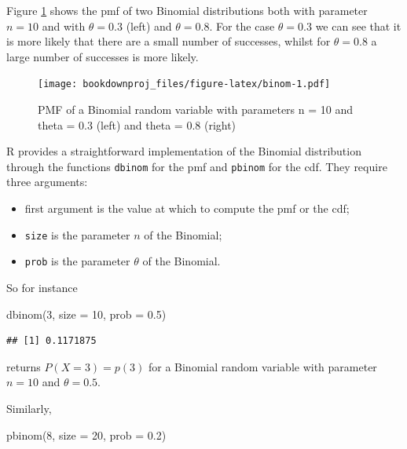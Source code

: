 \documentclass[
]{book}
\newenvironment{Shaded}{\begin{snugshade}}{\end{snugshade}}
\newcommand{\AttributeTok}[1]{\textcolor[rgb]{0.77,0.63,0.00}{#1}}
\newcommand{\DecValTok}[1]{\textcolor[rgb]{0.00,0.00,0.81}{#1}}
\newcommand{\FloatTok}[1]{\textcolor[rgb]{0.00,0.00,0.81}{#1}}
\newcommand{\FunctionTok}[1]{\textcolor[rgb]{0.00,0.00,0.00}{#1}}
\newcommand{\NormalTok}[1]{#1}
\theoremstyle{definition}
\theoremstyle{definition}
\theoremstyle{definition}
\theoremstyle{definition}
\theoremstyle{remark}
\begin{document}
Figure \ref{fig:binom} shows the pmf of two Binomial distributions both with parameter \(n=10\) and with \(\theta=0.3\) (left) and \(\theta=0.8\). For the case \(\theta=0.3\) we can see that it is more likely that there are a small number of successes, whilst for \(\theta=0.8\) a large number of successes is more likely.

\begin{figure}
\centering
\texttt{[image: bookdownproj\_files/figure-latex/binom-1.pdf]}
\caption{\label{fig:binom}PMF of a Binomial random variable with parameters n = 10 and theta = 0.3 (left) and theta = 0.8 (right)}
\end{figure}

R provides a straightforward implementation of the Binomial distribution through the functions \texttt{dbinom} for the pmf and \texttt{pbinom} for the cdf. They require three arguments:

\begin{itemize}
\item
  first argument is the value at which to compute the pmf or the cdf;
\item
  \texttt{size} is the parameter \(n\) of the Binomial;
\item
  \texttt{prob} is the parameter \(\theta\) of the Binomial.
\end{itemize}

So for instance

\begin{Shaded}
\begin{Highlighting}[]
\FunctionTok{dbinom}\NormalTok{(}\DecValTok{3}\NormalTok{, }\AttributeTok{size =} \DecValTok{10}\NormalTok{, }\AttributeTok{prob =} \FloatTok{0.5}\NormalTok{)}
\end{Highlighting}
\end{Shaded}

\begin{verbatim}
## [1] 0.1171875
\end{verbatim}

returns \(P(X=3)=p(3)\) for a Binomial random variable with parameter \(n=10\) and \(\theta = 0.5\).

Similarly,

\begin{Shaded}
\begin{Highlighting}[]
\FunctionTok{pbinom}\NormalTok{(}\DecValTok{8}\NormalTok{, }\AttributeTok{size =} \DecValTok{20}\NormalTok{, }\AttributeTok{prob =} \FloatTok{0.2}\NormalTok{)}
\end{Highlighting}
\end{Shaded}
\end{document}

